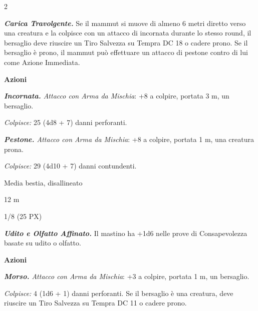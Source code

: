 \begin{multicols}{2}
{\emph{\textbf{Carica Travolgente.}} Se il mammut si muove di almeno 6 metri diretto verso una creatura e la colpisce con un attacco di incornata durante lo stesso round, il bersaglio deve riuscire un Tiro Salvezza su Tempra DC 18 o cadere prono. Se il bersaglio è prono, il mammut può effettuare un attacco di pestone contro di lui come Azione Immediata.

\textbf{Azioni}

\emph{\textbf{Incornata.} Attacco con Arma da Mischia}: +8 a colpire, portata 3 m, un bersaglio.

\emph{Colpisce:} 25 (4d8 + 7) danni perforanti.

\emph{\textbf{Pestone.} Attacco con Arma da Mischia}: +8 a colpire, portata 1 m, una creatura prona.

\emph{Colpisce:} 29 (4d10 + 7) danni contundenti.

\begin{description}[noitemsep, topsep=0pt, parsep=0pt, partopsep=0pt, itemsep=1pt, leftmargin=2.35cm,  labelwidth=2.2cm, itemindent=0cm, listparindent=0pt] %
\setlength{\baselineskip}{10pt}
\item[\textbf{Taglia/Tipo}] Media bestia, disallineato
\item[\textbf{Caratt.}] 
\item[\textbf{Punti Ferita}] 
\item[\textbf{Tiri Salvez.}] 
\item[\textbf{Movimento}] 12 m
\item[\textbf{Sfida}] 1/8 (25 PX)
\end{description}
\smallskip

\emph{\textbf{Udito e Olfatto Affinato.}} Il mastino ha +1d6 nelle prove di Consapevolezza basate su udito o olfatto.

\textbf{Azioni}

\emph{\textbf{Morso.} Attacco con Arma da Mischia}: +3 a colpire, portata 1 m, un bersaglio.

\emph{Colpisce:} 4 (1d6 + 1) danni perforanti. Se il bersaglio è una creatura, deve riuscire un Tiro Salvezza su Tempra DC 11 o cadere prono.

}
\end{multicols}
